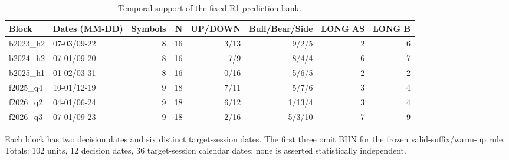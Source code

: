 \begin{table}[htbp]
\centering\small
\caption{Temporal support of the fixed R1 prediction bank.}
\label{tab:r2_coverage}
\setlength{\tabcolsep}{3.5pt}
\begin{tabular}{llrrrrrr}
\hline
Block & Dates (MM-DD) & Symbols & N & UP/DOWN & Bull/Bear/Side & LONG AS & LONG B \\
\hline
b2023\_h2 & 07-03/09-22 & 8 & 16 & 3/13 & 9/2/5 & 2 & 6 \\
b2024\_h2 & 07-01/09-20 & 8 & 16 & 7/9 & 8/4/4 & 6 & 7 \\
b2025\_h1 & 01-02/03-31 & 8 & 16 & 0/16 & 5/6/5 & 2 & 2 \\
f2025\_q4 & 10-01/12-19 & 9 & 18 & 7/11 & 5/7/6 & 3 & 4 \\
f2026\_q2 & 04-01/06-24 & 9 & 18 & 6/12 & 1/13/4 & 3 & 4 \\
f2026\_q3 & 07-01/09-23 & 9 & 18 & 2/16 & 5/3/10 & 7 & 9 \\
\hline
\end{tabular}
\par\smallskip\footnotesize Each block has two decision dates and six distinct target-session dates. The first three omit BHN for the frozen valid-suffix/warm-up rule. Totals: 102 units, 12 decision dates, 36 target-session calendar dates; none is asserted statistically independent.
\end{table}

